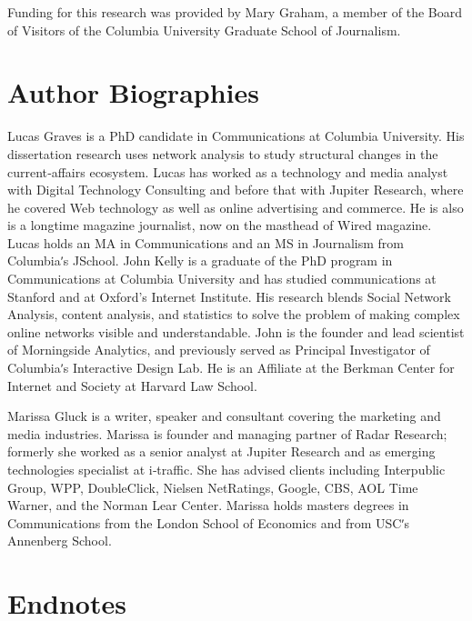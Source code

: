 Funding for this research was provided by Mary Graham, a member of
the Board of Visitors of the Columbia University Graduate School of
Journalism.

\chapter{Author Biographies}
Lucas Graves is a PhD candidate in Communications at Columbia
University. His dissertation research uses network analysis to study
structural changes in the current‐affairs ecosystem. Lucas has worked as a
technology and media analyst with Digital Technology Consulting and
before that with Jupiter Research, where he covered Web technology as
well as online advertising and commerce. He is also is a longtime
magazine journalist, now on the masthead of Wired magazine. Lucas holds
an MA in Communications and an MS in Journalism from Columbiaʹs JSchool.
John Kelly is a graduate of the PhD program in Communications at
Columbia University and has studied communications at Stanford and at
Oxford’s Internet Institute. His research blends Social Network Analysis,
content analysis, and statistics to solve the problem of making complex
online networks visible and understandable. John is the founder and lead
scientist of Morningside Analytics, and previously served as Principal
Investigator of Columbiaʹs Interactive Design Lab. He is an Affiliate at the
Berkman Center for Internet and Society at Harvard Law School.

Marissa Gluck is a writer, speaker and consultant covering the marketing
and media industries. Marissa is founder and managing partner of Radar
Research; formerly she worked as a senior analyst at Jupiter Research and
as emerging technologies specialist at i‐traffic. She has advised clients
including Interpublic Group, WPP, DoubleClick, Nielsen NetRatings,
Google, CBS, AOL Time Warner, and the Norman Lear Center. Marissa
holds masters degrees in Communications from the London School of
Economics and from USCʹs Annenberg School.

\chapter{Endnotes}

